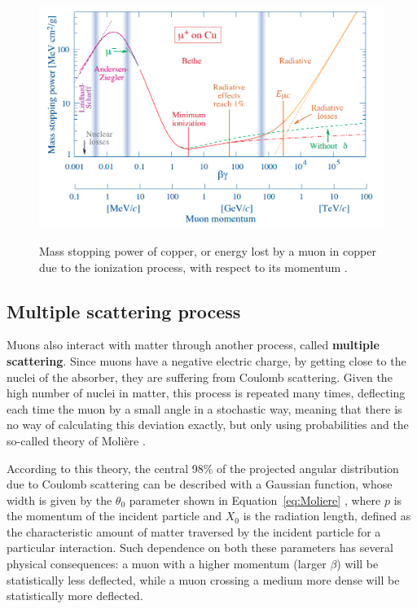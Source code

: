 \documentclass[a4paper, 11pt, twoside, openright]{report}
\begin{document}
\begin{figure}[htbp]
\begin{center}
\includegraphics[width=12cm, height=8cm]{figs/BB.png}
\caption{Mass stopping power of copper, or energy lost by a muon in copper due to the ionization process, with respect to its momentum \cite{PDGMuons}.}
\label{figure:BB}
\end{center}
\end{figure}

\subsection{Multiple scattering process}

Muons also interact with matter through another process, called \textbf{multiple scattering}. Since muons have a negative electric charge, by getting close to the nuclei of the absorber, they are suffering from Coulomb scattering. Given the high number of nuclei in matter, this process is repeated many times, deflecting each time the muon by a small angle in a stochastic way, meaning that there is no way of calculating this deviation exactly, but only using probabilities and the so-called theory of Moli\`ere \cite{Moliere}.

According to this theory, the central 98\% of the projected angular distribution due to Coulomb scattering can be described with a Gaussian function, whose width is given by the $\theta_0$ parameter shown in Equation~\ref{eq:Moliere} \cite{PDGScat}, where $p$ is the momentum of the incident particle and $X_0$ is the radiation length, defined as the characteristic amount of matter traversed by the incident particle for a particular interaction. Such dependence on both these parameters has several physical consequences: a muon with a higher momentum (larger $\beta$) will be statistically less deflected, while a muon crossing a medium more dense will be statistically more deflected.
\end{document}
